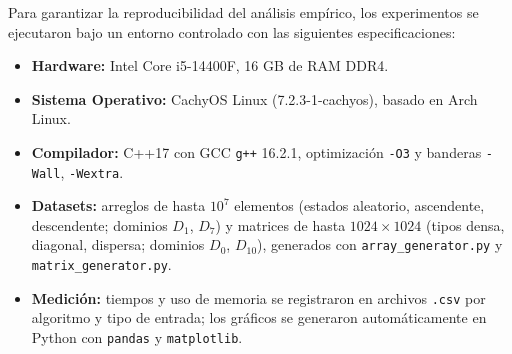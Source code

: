 Para garantizar la reproducibilidad del análisis empírico, los experimentos se ejecutaron bajo un entorno controlado con las siguientes especificaciones:
\begin{itemize}
    \item \textbf{Hardware:} Intel Core i5-14400F, 16 GB de RAM DDR4.
    \item \textbf{Sistema Operativo:} CachyOS Linux (7.2.3-1-cachyos), basado en Arch Linux.
    \item \textbf{Compilador:} C++17 con GCC \texttt{g++} 16.2.1, optimización \texttt{-O3} y banderas \texttt{-Wall}, \texttt{-Wextra}.
    \item \textbf{Datasets:} arreglos de hasta $10^7$ elementos (estados aleatorio, ascendente, descendente; dominios $D_1$, $D_7$) y matrices de hasta $1024 \times 1024$ (tipos densa, diagonal, dispersa; dominios $D_0$, $D_{10}$), generados con \texttt{array\_generator.py} y \texttt{matrix\_generator.py}.
    \item \textbf{Medición:} tiempos y uso de memoria se registraron en archivos \texttt{.csv} por algoritmo y tipo de entrada; los gráficos se generaron automáticamente en Python con \texttt{pandas} y \texttt{matplotlib}.
\end{itemize}
